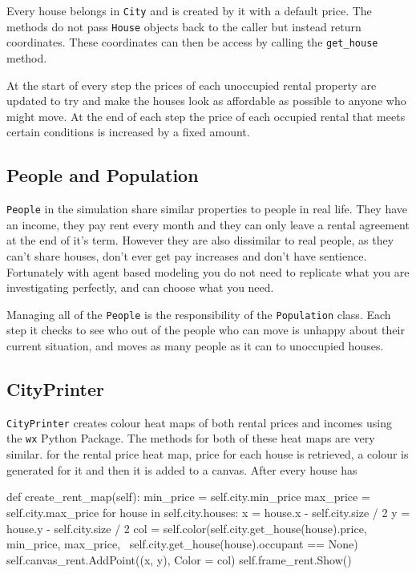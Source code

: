 \par
Every house belongs in \texttt{City} and is created by it with a default price. The methods do not pass \texttt{House} objects back to the caller but instead return coordinates. These coordinates can then be access by calling the \texttt{get\_house} method.

\par
At the start of every step the prices of each unoccupied rental property are updated to try and make the houses look as affordable as possible to anyone who might move. At the end of each step the price of each occupied rental that meets certain conditions is increased by a fixed amount.

\subsection{People and Population}

\par
\texttt{People} in the simulation share similar properties to people in real life. They have an income, they pay rent every month and they can only leave a rental agreement at the end of it's term. However they are also dissimilar to real people, as they can't share houses, don't ever get pay increases and don't have sentience. Fortunately with agent based modeling you do not need to replicate what you are investigating perfectly, and can choose what you need.

Managing all of the \texttt{People} is the responsibility of the \texttt{Population} class. Each step it checks to see who out of the people who can move is unhappy about their current situation, and moves as many people as it can to unoccupied houses.

\subsection{CityPrinter}

\texttt{CityPrinter} creates colour heat maps of both rental prices and incomes using the \texttt{wx} Python Package. The methods for both of these heat maps are very similar. for the rental price heat map, price for each house is retrieved, a colour is generated for it and then it is added to a canvas. After every house has 

\begin{code}[language=Python]
def create_rent_map(self):
    min_price = self.city.min_price
    max_price = self.city.max_price
    for house in self.city.houses:
        x = house.x - self.city.size / 2
        y = house.y - self.city.size / 2
        col = self.color(self.city.get_house(house).price, min_price, max_price, \
                self.city.get_house(house).occupant == None)
        self.canvas_rent.AddPoint((x, y), Color = col)
    self.frame_rent.Show()
\end{code}

